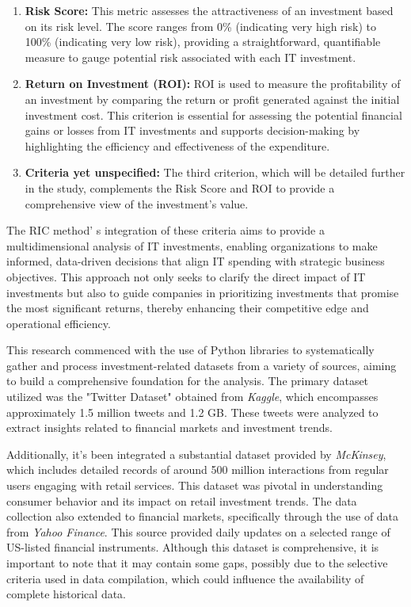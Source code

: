 {\begin{enumerate}
\def\labelenumi{\arabic{enumi}.}
\item
  {\bfseries Risk Score:} This metric assesses the attractiveness of an
  investment based on its risk level. The score ranges from 0\%
  (indicating very high risk) to 100\% (indicating very low risk),
  providing a straightforward, quantifiable measure to gauge potential
  risk associated with each IT investment.
\item
  {\bfseries Return on Investment (ROI):} ROI is used to measure the
  profitability of an investment by comparing the return or profit
  generated against the initial investment cost. This criterion is
  essential for assessing the potential financial gains or losses from
  IT investments and supports decision-making by highlighting the
  efficiency and effectiveness of the expenditure.
\item
  {\bfseries Criteria yet unspecified:} The third criterion, which will be
  detailed further in the study, complements the Risk Score and ROI to
  provide a comprehensive view of the investment's value.
\end{enumerate}

The RIC method' s integration of these criteria aims to
provide a multidimensional analysis of IT investments, enabling
organizations to make informed, data-driven decisions that align IT
spending with strategic business objectives. This approach not only
seeks to clarify the direct impact of IT investments but also to guide
companies in prioritizing investments that promise the most significant
returns, thereby enhancing their competitive edge and operational
efficiency.

This research commenced with the use of Python libraries to
systematically gather and process investment-related datasets from a
variety of sources, aiming to build a comprehensive foundation for the
analysis. The primary dataset utilized was the "Twitter Dataset"
obtained from \emph{Kaggle}, which encompasses approximately 1.5 million
tweets and 1.2 GB. These tweets were analyzed to extract insights
related to financial markets and investment trends.

Additionally, it's been integrated a substantial dataset provided by
\emph{McKinsey}, which includes detailed records of around 500 million
interactions from regular users engaging with retail services. This
dataset was pivotal in understanding consumer behavior and its impact on
retail investment trends. The data collection also extended to financial
markets, specifically through the use of data from \emph{Yahoo Finance}.
This source provided daily updates on a selected range of US-listed
financial instruments. Although this dataset is comprehensive, it is
important to note that it may contain some gaps, possibly due to the
selective criteria used in data compilation, which could influence the
availability of complete historical data.

}
